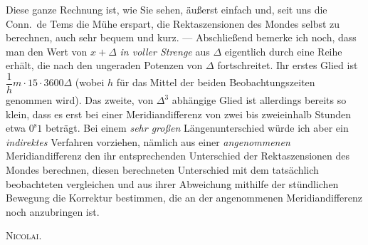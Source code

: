 Diese ganze Rechnung ist, wie Sie sehen, äußerst einfach und, seit uns die Conn.\ de Tems die Mühe erspart, die Rektaszensionen des Mondes selbst zu berechnen, auch sehr bequem und kurz. --- Abschließend bemerke ich noch, dass man den Wert von $x+\Delta$ \emph{in voller Strenge} aus $\Delta$ eigentlich durch eine Reihe erhält, die nach den ungeraden Potenzen von $\Delta$ fortschreitet. Ihr erstes Glied ist $\dfrac{1}{h}m\cdot15\cdot3600\Delta$ (wobei $h$ für das Mittel der beiden Beobachtungszeiten genommen wird). Das zweite, von $\Delta^3$ abhängige Glied ist allerdings bereits so klein, dass es erst bei einer Meridiandifferenz von zwei bis zweieinhalb Stunden etwa $0^{\mathrm{s}}1$ beträgt.
Bei einem \emph{sehr großen} Längenunterschied würde ich aber ein \emph{indirektes} Verfahren vorziehen, nämlich aus einer \emph{angenommenen} Meridiandifferenz den ihr entsprechenden Unterschied der Rektaszensionen des Mondes berechnen, diesen berechneten Unterschied mit dem tatsächlich beobachteten vergleichen und aus ihrer Abweichung mithilfe der stündlichen Bewegung die Korrektur bestimmen, die an der angenommenen Meridiandifferenz noch anzubringen ist.

\begin{flushright}
\textsc{Nicolai.}
\end{flushright}
